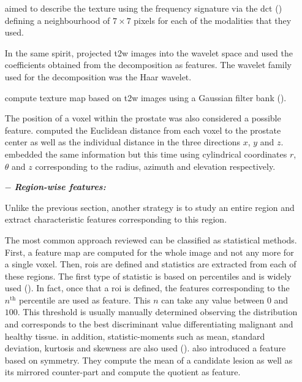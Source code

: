 \begin{enumerate}[leftmargin=*]
  \cite{Chan2003} aimed to describe the texture using the frequency signature via the \acf{dct} (\cite{Ahmed1974}) defining a neighbourhood of $7 \times 7$ pixels for each of the modalities that they used.

  In the same spirit, \cite{Viswanath2012} projected \ac{t2w} images into the wavelet space and used the coefficients obtained from the decomposition as features. The wavelet family used for the decomposition was the Haar wavelet.

  \cite{Litjens2014} compute texture map based on \ac{t2w} images using a Gaussian filter bank (\cite{Leung2001}).

  The position of a voxel within the prostate was also considered a possible feature. \cite{Litjens2011,Litjens2014} computed the Euclidean distance from each voxel to the prostate center as well as the individual distance in the three directions $x$, $y$ and $z$. \cite{Chan2003} embedded the same information but this time using cylindrical coordinates $r$, $\theta$ and $z$ corresponding to the radius, azimuth and elevation respectively.

\item[$-$] \textbf{\textit{Region-wise features:}}

  Unlike the previous section, another strategy is to study an entire region and extract characteristic features corresponding to this region.

  The most common approach reviewed can be classified as statistical methods. First, a feature map are computed for the whole image and not any more for a single voxel. Then, \acp{roi} are defined and statistics are extracted from each of these regions. The first type of statistic is based on percentiles and is widely used (\cite{Antic2013,Litjens2011,Litjens2012,Litjens2014,Peng2013,Tiwari2009a,Tiwari2010,Tiwari2013,Viswanath2008,Viswanath2008a,Viswanath2011,Viswanath2012,Vos2008,Vos2008a,Vos2010,Vos2012}). In fact, once that a \ac{roi} is defined, the features corresponding to the $n^{\text{th}}$ percentile are used as feature. This $n$ can take any value between $0$ and $100$. This threshold is usually manually determined observing the distribution and corresponds to the best discriminant value differentiating malignant and healthy tissue. in addition, statistic-moments such as mean, standard deviation, kurtosis and skewness are also used (\cite{Ampeliotis2007,Ampeliotis2008,Antic2013,Niaf2011,Niaf2012,Peng2013}). \cite{Litjens2014} also introduced a feature based on symmetry. They compute the mean of a candidate lesion as well as its mirrored counter-part and compute the quotient as feature.


\end{enumerate}
